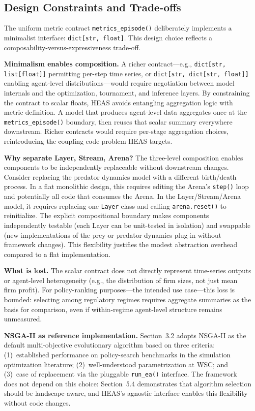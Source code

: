 \documentclass{wscpaperproc}
\begin{document}
\subsection{Design Constraints and Trade-offs}
\label{sec:design-constraints}

The uniform metric contract \texttt{metrics\_episode()} deliberately implements
a minimalist interface: \texttt{dict[str, float]}. This design choice reflects a
composability-versus-expressiveness trade-off.

\textbf{Minimalism enables composition.} A richer contract---e.g.,
\texttt{dict[str, list[float]]} permitting per-step time series, or
\texttt{dict[str, dict[str, float]]} enabling agent-level distributions---would
require negotiation between model internals and the optimization, tournament, and
inference layers. By constraining the contract to scalar floats, HEAS avoids
entangling aggregation logic with metric definition. A model that produces
agent-level data aggregates once at the \texttt{metrics\_episode()} boundary, then
reuses that scalar summary everywhere downstream. Richer contracts would require
per-stage aggregation choices, reintroducing the coupling-code problem HEAS targets.

\textbf{Why separate Layer, Stream, Arena?} The three-level composition enables
components to be independently replaceable without downstream changes. Consider
replacing the predator dynamics model with a different birth/death process. In a
flat monolithic design, this requires editing the Arena's \texttt{step()} loop
and potentially all code that consumes the Arena. In the Layer/Stream/Arena model,
it requires replacing one \texttt{Layer} class and calling \texttt{arena.reset()}
to reinitialize. The explicit compositional boundary makes components independently
testable (each Layer can be unit-tested in isolation) and swappable (new implementations
of the prey or predator dynamics plug in without framework changes). This flexibility
justifies the modest abstraction overhead compared to a flat implementation.


\textbf{What is lost.} The scalar contract does not directly represent time-series
outputs or agent-level heterogeneity (e.g., the distribution of firm sizes, not
just mean firm profit). For policy-ranking purposes---the intended use case---this
loss is bounded: selecting among regulatory regimes requires aggregate summaries
as the basis for comparison, even if within-regime agent-level structure remains
unmeasured.

\textbf{NSGA-II as reference implementation.} Section~3.2 adopts NSGA-II as the
default multi-objective evolutionary algorithm based on three criteria:
(1)~established performance on policy-search benchmarks in the simulation
optimization literature; (2)~well-understood parametrization at WSC; and
(3)~ease of replacement via the pluggable \texttt{run\_ea()} interface. The
framework does not depend on this choice: Section~5.4 demonstrates that algorithm
selection should be landscape-aware, and HEAS's agnostic interface enables this
flexibility without code changes.
\end{document}
